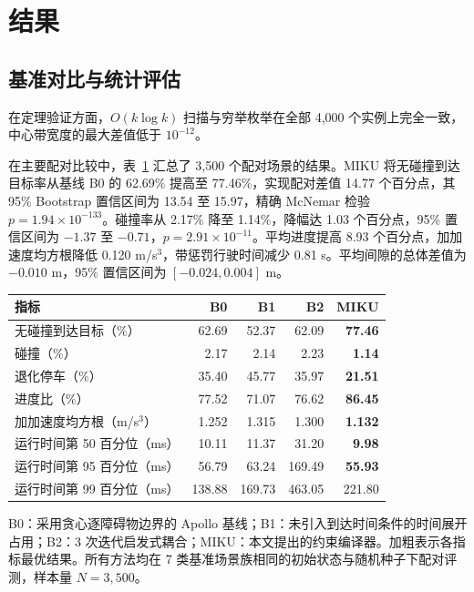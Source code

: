 \section{结果}
\label{zh:sec:results}

\subsection{基准对比与统计评估}
\label{zh:subsec:results_main}

在定理验证方面，$O(k\log k)$ 扫描与穷举枚举在全部 4,000 个实例上完全一致，中心带宽度的最大差值低于 $10^{-12}$。

在主要配对比较中，表~\ref{zh:tab:main_results} 汇总了 3,500 个配对场景的结果。MIKU 将无碰撞到达目标率从基线 B0 的 62.69\% 提高至 77.46\%，实现配对差值 14.77 个百分点，其 95\% Bootstrap 置信区间为 13.54 至 15.97，精确 McNemar 检验 $p=1.94\times10^{-133}$。碰撞率从 2.17\% 降至 1.14\%，降幅达 1.03 个百分点，95\% 置信区间为 $-1.37$ 至 $-0.71$，$p=2.91\times10^{-11}$。平均进度提高 8.93 个百分点，加加速度均方根降低 0.120 m/s$^3$，带惩罚行驶时间减少 0.81 s。平均间隙的总体差值为 $-0.010$ m，95\% 置信区间为 $[-0.024,0.004]$ m。

\begin{table}
{%
\begin{tabular}{lrrrr}
\toprule
指标 & B0 & B1 & B2 & MIKU \\
\midrule
无碰撞到达目标（\%） & 62.69 & 52.37 & 62.09 & \textbf{77.46} \\
碰撞（\%） & 2.17 & 2.14 & 2.23 & \textbf{1.14} \\
退化停车（\%） & 35.40 & 45.77 & 35.97 & \textbf{21.51} \\
进度比（\%） & 77.52 & 71.07 & 76.62 & \textbf{86.45} \\
加加速度均方根（m/s$^3$） & 1.252 & 1.315 & 1.300 & \textbf{1.132} \\
运行时间第 50 百分位（ms） & 10.11 & 11.37 & 31.20 & \textbf{9.98} \\
运行时间第 95 百分位（ms） & 56.79 & 63.24 & 169.49 & \textbf{55.93} \\
运行时间第 99 百分位（ms） & 138.88 & 169.73 & 463.05 & 221.80 \\
\bottomrule
\end{tabular}}
\begin{tabnote}[注]
B0：采用贪心逐障碍物边界的 Apollo 基线；B1：未引入到达时间条件的时间展开占用；B2：3 次迭代启发式耦合；MIKU：本文提出的约束编译器。加粗表示各指标最优结果。所有方法均在 7 类基准场景族相同的初始状态与随机种子下配对评测，样本量 $N=3,500$。
\end{tabnote}
\label{zh:tab:main_results}
\end{table}

